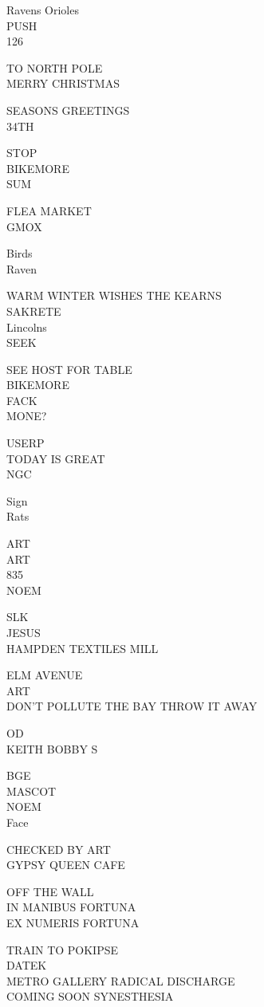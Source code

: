 \documentclass[10pt,letterpaper]{article}
\begin{document}
Ravens Orioles\\
PUSH\\
126

TO NORTH POLE\\
MERRY CHRISTMAS

SEASONS GREETINGS\\
34TH

STOP\\
BIKEMORE\\
SUM

FLEA MARKET\\
GMOX

Birds\\
Raven

WARM WINTER WISHES THE KEARNS\\
SAKRETE\\
Lincolns\\
SEEK

SEE HOST FOR TABLE\\
BIKEMORE\\
FACK\\
MONE?

USERP\\
TODAY IS GREAT\\
NGC

Sign\\
Rats

ART\\
ART\\
835\\
NOEM

SLK\\
JESUS\\
HAMPDEN TEXTILES MILL

ELM AVENUE\\
ART\\
DON'T POLLUTE THE BAY THROW IT AWAY

OD\\
KEITH BOBBY S

BGE\\
MASCOT\\
NOEM\\
Face

CHECKED BY ART\\
GYPSY QUEEN CAFE

OFF THE WALL\\
IN MANIBUS FORTUNA\\
EX NUMERIS FORTUNA

TRAIN TO POKIPSE\\
DATEK\\
METRO GALLERY RADICAL DISCHARGE\\
COMING SOON SYNESTHESIA
\end{document}
